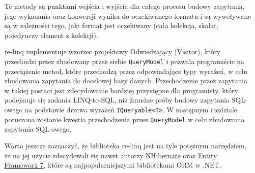Te metody są punktami wejścia i wyjścia dla całego procesu budowy zapytania, jego wykonania oraz konwersji wyniku do oczekiwanego formatu i są wywoływane są w zależności tego, jaki format jest oczekiwany (cała kolekcja, skalar, pojedynczy element z kolekcji).

re-linq implementuje wzorzec projektowy Odwiedzający (Visitor), który przechodzi przez zbudowany przez siebie \texttt{QueryModel} i pozwala programiście na przeciążenie metod, które przechodzą przez odpowiadające typy wyrażeń, w celu zbudowania zapytania do docelowej bazy danych. Przechodzenie przez zapytania w takiej postaci jest zdecydowanie bardziej przystępne dla programisty, który podejmuje się zadania LINQ-to-SQL, niż żmudne próby budowy zapytania SQL-owego na podstawie drzewa wyrażeń \texttt{IQueryable<T>}. W następnym rozdziale poruszona zostanie kwestia przechodzenia przez \texttt{QueryModel} w celu zbudowania zapytania SQL-owego.

Warto jeszcze zaznaczyć, że biblioteka re-linq jest na tyle potężnym narzędziem, że na jej użycie zdecydowali się nawet autorzy \href{https://github.com/nhibernate/nhibernate-core/blob/d82d1381fb6b427da91d357398502a7f4b482ccc/src/NHibernate/Linq/NhRelinqQueryParser.cs}{NHibernate} oraz \linebreak \href{https://github.com/aspnet/EntityFramework/blob/f386095005e46ea3aa4d677e4439cdac113dbfb1/src/EFCore.Relational/Query/ExpressionVisitors/Internal/EqualityPredicateExpandingVisitor.cs}{Entity Framework 7}, które są najpopularniejszymi bibliotekami ORM w .NET.